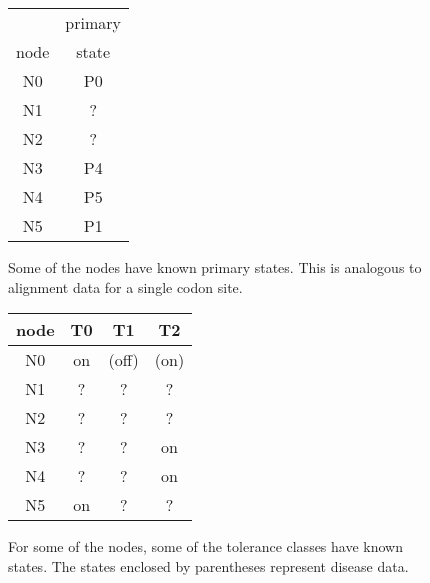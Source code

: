 \documentclass{article}
\begin{document}
\begin{figure}
\centering
\begin{tabular}{c c}
       & primary \\
  node & state \\
  \hline
  N0 & P0 \\
  N1 & ? \\
  N2 & ? \\
  N3 & P4 \\
  N4 & P5 \\
  N5 & P1
\end{tabular}
\caption{
	Some of the nodes have known primary states.
	This is analogous to alignment data for a single codon site.}
\end{figure}

\begin{figure}
\centering
\begin{tabular}{c c c c}
  node & T0 & T1 & T2 \\
  \hline
  N0 & on & (off) & (on) \\
  N1 & ? & ? & ? \\
  N2 & ? & ? & ? \\
  N3 & ? & ? & on \\
  N4 & ? & ? & on \\
  N5 & on & ? & ?
\end{tabular}
\caption{
	For some of the nodes,
	some of the tolerance classes have known states.
	The states enclosed by parentheses represent
	disease data.}
\end{figure}
\end{document}
